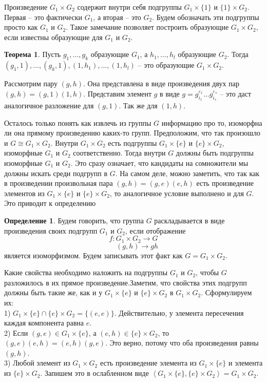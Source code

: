 \documentclass[10pt,a4paper,oneside]{book}
\theoremstyle{definition}
\newtheorem*{defn}{\color{yellow!30!red} Определение}
\newtheorem{thm}{\color{red!40!black}Теорема}
\def\eps{\varepsilon}
\def\lan{\left\langle }
\def\ran{\right\rangle}
\def\thrm{\begin{thm}}
\def\ethrm{\end{thm}}
\def\dfn{\begin{defn}}
\def\edfn{\end{defn}}
\begin{document}
Произведение $G_1\times G_2$ содержит внутри себя подгруппы $G_1\times \{1\}$  и $\{1\}\times G_2$. Первая -- это фактически $G_1$, а вторая -- это $G_2$. Будем обозначать эти подгруппы просто как $G_1$ и $G_2$. Такое замечание позволяет построить образующие $G_1\times G_2$, если известны образующие для $G_1$ и $G_2$.

\thrm Пусть $g_1,\dots,g_k$ образующие $G_1$, а $h_1,\dots,h_l$ образующие $G_2$. Тогда $(g_1,1), \dots, (g_k,1), (1,h_1),\dots,(1,h_l)$ -- это образующие $G_1\times G_2$.
\ethrm
\proof Рассмотрим пару $(g,h)$. Она представлена в виде произведения двух пар $(g,h)=(g,1)(1,h)$. Представим элемент $g$ в виде $g=g_{i_1}^{\eps_1}\dots g_{i_s}^{\eps_s}$ -- это даст аналогичное разложение для $(g,1)$. Так же для $(1,h)$.
\endproof

Осталось только понять как извлечь из группы $G$ информацию про то, изоморфна ли она прямому произведению каких-то групп. Предположим, что так произошло и $G\cong G_1\times G_2$. Внутри $G_1\times G_2$ есть подгруппы $G_1\times \{e\}$ и $\{e\}\times G_2$, изоморфные $G_1$ и $G_2$ соответственно. Тогда внутри $G$ должны быть подгруппы изоморфные $G_1$ и $G_2$. Это сразу означает, что кандидаты на сомножители мы должны искать среди подгрупп в $G$. На самом деле, можно заметить, что так как в произведении произвольная пара $(g,h)=(g,e)(e,h)$ есть произведение элементов из $G_1\times \{e\}$ и $\{e\}\times G_2$, то аналогичное условие выполнено и для $G$. Это приводит к определению

\dfn Будем говорить, что группа $G$ раскладывается в виде произведения своих подгрупп $G_1$ и $G_2$, если отображение
$$f\colon G_1\times G_2 \to G$$
$$\quad (g,h)\to gh$$
является изоморфизмом. Будем записывать этот факт как $G=G_1\times G_2$.
\edfn

Какие свойства необходимо наложить на подгруппы $G_1$ и $G_2$, чтобы $G$ разложилось в их прямое произведение.Заметим, что свойства этих подгрупп должны быть такие же, как и у $G_1\times \{e\}$ и $\{e\}\times G_2$ в $G_1\times G_2$. Сформулируем их:\\
1) $G_1\times \{e\} \cap \{e\}\times G_2 =\{(e,e)\}$. Действительно, у элемента пересечения каждая компонента равна $e$.\\
2) Если $(g,e)\in G_1\times \{e\}$, а $(e,h)\in \{e\}\times G_2$, то $(g,e)(e,h)=(e,h)(g,e)$. Это верно, потому что оба произведения равны $(g,h)$.\\
3) Любой элемент из $G_1\times G_2$ есть произведение элемента из $G_1\times \{e\}$  и элемента из $\{e\}\times G_2$. Запишем это в ослабленном виде $\lan G_1\times \{e\},\{e\}\times G_2\ran = G_1\times G_2$.\\
\end{document}
